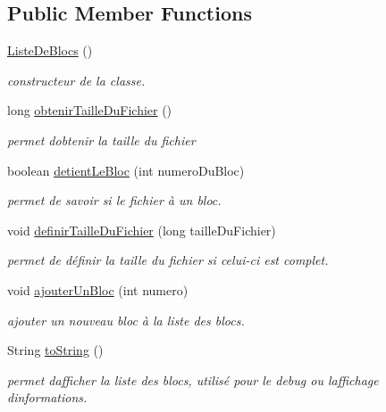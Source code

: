 \subsection*{Public Member Functions}
\begin{DoxyCompactItemize}
\item 
\mbox{\label{classcommun_1_1ListeDeBlocs_a558790ed6d6a282260d81f4e7b4789a7}} 
\hyperlink{classcommun_1_1ListeDeBlocs_a558790ed6d6a282260d81f4e7b4789a7}{Liste\+De\+Blocs} ()
\begin{DoxyCompactList}\small\item\em constructeur de la classe. \end{DoxyCompactList}\item 
long \hyperlink{classcommun_1_1ListeDeBlocs_a52a7e4ed2a3e31d0f1ee2f0c62f8fef0}{obtenir\+Taille\+Du\+Fichier} ()
\begin{DoxyCompactList}\small\item\em permet d\textquotesingle{}obtenir la taille du fichier \end{DoxyCompactList}\item 
boolean \hyperlink{classcommun_1_1ListeDeBlocs_a2a41b1d4ac1c526012a09f415acd5bfe}{detient\+Le\+Bloc} (int numero\+Du\+Bloc)
\begin{DoxyCompactList}\small\item\em permet de savoir si le fichier à un bloc. \end{DoxyCompactList}\item 
void \hyperlink{classcommun_1_1ListeDeBlocs_a31c5d230f4b27f5c94ede5c4104eea1c}{definir\+Taille\+Du\+Fichier} (long taille\+Du\+Fichier)
\begin{DoxyCompactList}\small\item\em permet de définir la taille du fichier si celui-\/ci est complet. \end{DoxyCompactList}\item 
void \hyperlink{classcommun_1_1ListeDeBlocs_a76b292081d24cfdffb66961056e0dab8}{ajouter\+Un\+Bloc} (int numero)
\begin{DoxyCompactList}\small\item\em ajouter un nouveau bloc à la liste des blocs. \end{DoxyCompactList}\item 
\mbox{\label{classcommun_1_1ListeDeBlocs_af9cae5828ea69d088e4ecb14eaafe7d4}} 
String \hyperlink{classcommun_1_1ListeDeBlocs_af9cae5828ea69d088e4ecb14eaafe7d4}{to\+String} ()
\begin{DoxyCompactList}\small\item\em permet d\textquotesingle{}afficher la liste des blocs, utilisé pour le debug ou l\textquotesingle{}affichage d\textquotesingle{}informations. \end{DoxyCompactList}\end{DoxyCompactItemize}


